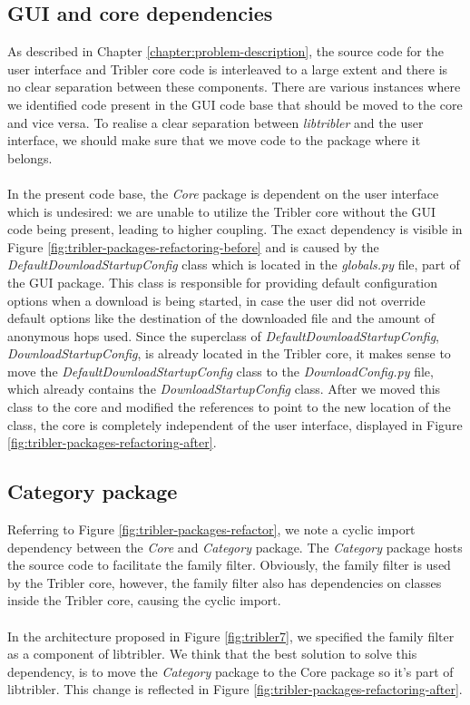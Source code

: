\subsection{GUI and core dependencies}
\label{subsec:gui-core-packages}
As described in Chapter \ref{chapter:problem-description}, the source code for the user interface and Tribler core code is interleaved to a large extent and there is no clear separation between these components. There are various instances where we identified code present in the GUI code base that should be moved to the core and vice versa. To realise a clear separation between \emph{libtribler} and the user interface, we should make sure that we move code to the package where it belongs.\\\\
In the present code base, the \emph{Core} package is dependent on the user interface which is undesired: we are unable to utilize the Tribler core without the GUI code being present, leading to higher coupling. The exact dependency is visible in Figure \ref{fig:tribler-packages-refactoring-before} and is caused by the \emph{DefaultDownloadStartupConfig} class which is located in the \emph{globals.py} file, part of the GUI package. This class is responsible for providing default configuration options when a download is being started, in case the user did not override default options like the destination of the downloaded file and the amount of anonymous hops used. Since the superclass of \emph{DefaultDownloadStartupConfig}, \emph{DownloadStartupConfig}, is already located in the Tribler core, it makes sense to move the \emph{DefaultDownloadStartupConfig} class to the \emph{DownloadConfig.py} file, which already contains the \emph{DownloadStartupConfig} class. After we moved this class to the core and modified the references to point to the new location of the class, the core is completely independent of the user interface, displayed in Figure \ref{fig:tribler-packages-refactoring-after}.

\subsection{Category package}
Referring to Figure \ref{fig:tribler-packages-refactor}, we note a cyclic import dependency between the \emph{Core} and \emph{Category} package. The \emph{Category} package hosts the source code to facilitate the family filter. Obviously, the family filter is used by the Tribler core, however, the family filter also has dependencies on classes inside the Tribler core, causing the cyclic import.\\\\
In the architecture proposed in Figure \ref{fig:tribler7}, we specified the family filter as a component of libtribler. We think that the best solution to solve this dependency, is to move the \emph{Category} package to the Core package so it's part of libtribler. This change is reflected in Figure \ref{fig:tribler-packages-refactoring-after}.

